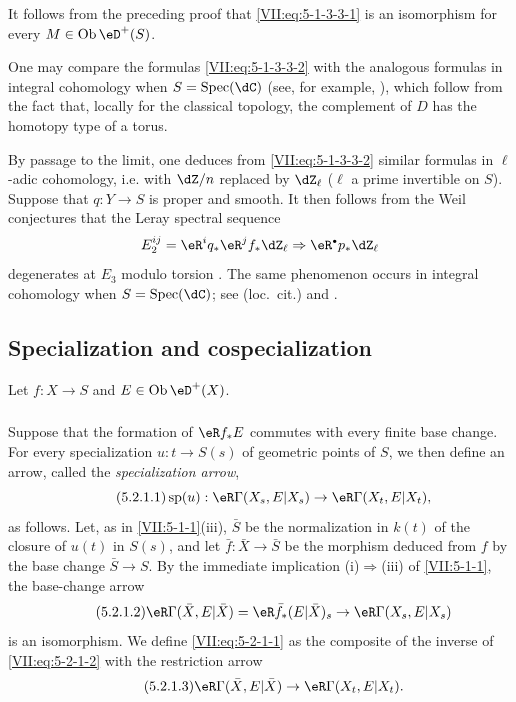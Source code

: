 It follows from the preceding proof that \eqref{VII:eq:5-1-3-3-1} is an
isomorphism for every $M\in\ob\eD^+(S)$.

One may compare the formulas \eqref{VII:eq:5-1-3-3-2} with the analogous
formulas in integral cohomology when $S=\spec(\dC)$ (see, for example,
\cite[3.1]{de71-2}), which follow from the fact that, locally for the classical
topology, the complement of $D$ has the homotopy type of a torus.

By passage to the limit, one deduces from \eqref{VII:eq:5-1-3-3-2} similar
formulas in $\ell$-adic cohomology, i.e. with $\dZ/n$ replaced by $\dZ_\ell$
($\ell$ a prime invertible on $S$). Suppose that $q:Y\to S$ is proper and
smooth. It then follows from the Weil conjectures \cite{de74,de80} that the
Leray spectral sequence
\[
  E_2^{i j} = \eR^i q_\ast \eR^j f_\ast \dZ_\ell \Rightarrow \eR^\bullet p_\ast \dZ_\ell 
\]
degenerates at $E_3$ modulo torsion \cite[\S 6]{de71-1}. The same phenomenon
occurs in integral cohomology when $S=\spec(\dC)$; see (loc.\ cit.) and
\cite[3.2.13]{de71-2}.





\subsection{Specialization and cospecialization}\label{VII:5-2}

Let $f:X\to S$ and $E\in\ob\eD^+(X)$.






\subsubsection{}\label{VII:5-2-1}

Suppose that the formation of $\eR f_\ast E$ commutes with every finite base
change. For every specialization $u:t\to S(s)$ of geometric points of $S$,
we then define an arrow, called the \emph{specialization arrow},
\begin{equation*}\tag{5.2.1.1}\label{VII:eq:5-2-1-1}
  \spe(u):\eR\Gamma(X_s,E|X_s) \to \eR\Gamma(X_t,E|X_t) \text{,}
\end{equation*}
as follows. Let, as in \ref{VII:5-1-1}(iii), $\bar S$ be the normalization in
$k(t)$ of the closure of $u(t)$ in $S(s)$, and let
$\bar f:\bar X\to \bar S$ be the morphism deduced from $f$ by the base change
$\bar S\to S$. By the immediate implication (i)$\Rightarrow$(iii) of
\ref{VII:5-1-1}, the base-change arrow
\begin{equation*}\tag{5.2.1.2}\label{VII:eq:5-2-1-2}
  \eR\Gamma(\bar X,E|\bar X)=\eR\bar f_\ast (E|\bar X)_s \to \eR\Gamma(X_s,E|X_s) 
\end{equation*}
is an isomorphism. We define \eqref{VII:eq:5-2-1-1} as the composite of the
inverse of \eqref{VII:eq:5-2-1-2} with the restriction arrow
\begin{equation*}\tag{5.2.1.3}\label{VII:eq:5-2-1-3}
  \eR\Gamma(\bar X,E|\bar X) \to \eR\Gamma(X_t,E|X_t) \text{.}
\end{equation*}






